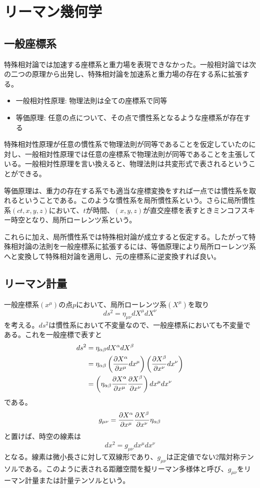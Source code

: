 \section{リーマン幾何学}

\subsection{一般座標系}
    特殊相対論では加速する座標系と重力場を表現できなかった。一般相対論では次の二つの原理から出発し、特殊相対論を加速系と重力場の存在する系に拡張する。
    \begin{itemize}
        \item 一般相対性原理: 物理法則は全ての座標系で同等
        \item 等価原理: 任意の点について、その点で慣性系となるような座標系が存在する
    \end{itemize}
    特殊相対性原理が任意の慣性系で物理法則が同等であることを仮定していたのに対し、一般相対性原理では任意の座標系で物理法則が同等であることを主張している。一般相対性原理を言い換えると、物理法則は共変形式で表されるということができる。

    等価原理は、重力の存在する系でも適当な座標変換をすれば一点では慣性系を取れるということである。このような慣性系を局所慣性系という。さらに局所慣性系$(ct, x, y, z)$において、$t$が時間、$(x, y, z)$が直交座標を表すときミンコフスキー時空となり、局所ローレンツ系という。

    これらに加え、局所慣性系では特殊相対論が成立すると仮定する。したがって特殊相対論の法則を一般座標系に拡張するには、等価原理により局所ローレンツ系へと変換して特殊相対論を適用し、元の座標系に逆変換すれば良い。

\subsection{リーマン計量}
    一般座標系$(x^\mu)$の点$p$において、局所ローレンツ系$(X^\mu)$を取り
        \[ds^2 = \eta_{\mu\nu} dX^\mu dX^\nu\]
    を考える。$ds^2$は慣性系において不変量なので、一般座標系においても不変量である。これを一般座標で表すと
    \begin{align*}
        ds^2
            &= \eta_{\alpha\beta} dX^\alpha dX^\beta\\
            &= \eta_{\alpha\beta} \left(\pdv{X^\alpha}{x^\mu}dx^\mu\right) \left(\pdv{X^\beta}{x^\nu}dx^\nu\right)\\
            &= \left(\eta_{\alpha\beta}\pdv{X^\alpha}{x^\mu}\pdv{X^\beta}{x^\nu}\right) dx^\mu dx^\nu
    \end{align*}
    である。
        \[g_{\mu\nu} = \pdv{X^\alpha}{x^\mu}\pdv{X^\beta}{x^\nu}\eta_{\alpha\beta}\]
    と置けば、時空の線素は
        \[dx^2 = g_{\mu\nu} dx^\mu dx^\nu\]
    となる。線素は微小長さに対して双線形であり、$g_{\mu\nu}$は正定値でない2階対称テンソルである。このように表される距離空間を擬リーマン多様体と呼び、$g_{\mu\nu}$をリーマン計量または計量テンソルという。

